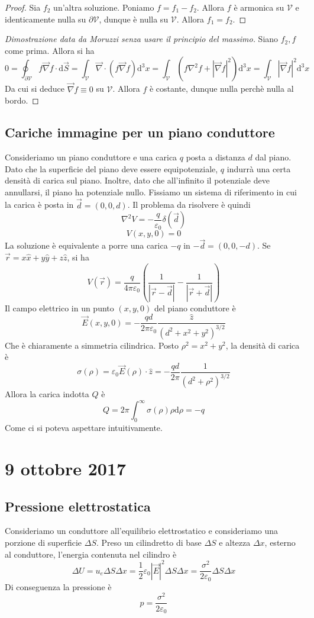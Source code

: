 \documentclass[a4paper,11pt]{book}
\let\oldnabla\nabla
\renewcommand{\nabla}{\vec{\oldnabla}}
\newcommand{\dif}{\mathrm{d}}
\newcommand{\lap}{\oldnabla^2}
\let\oldepsilon\epsilon
\let\oldvarepsilon\varepsilon
\renewcommand{\epsilon}{\oldvarepsilon}
\renewcommand{\varepsilon}{\oldepsilon}
\newcommand{\V}{\mathcal{V}}
\theoremstyle{definition}
\theoremstyle{theorem}
\begin{document}
	\begin{proof}
		Sia $f_2$ un'altra soluzione. Poniamo $f=f_1-f_2$. Allora $f$ è armonica su $\mathcal{V}$ e identicamente nulla su $\partial\mathcal{V}$, dunque è nulla su $\mathcal{V}$. Allora $f_1=f_2$.
	\end{proof}
	\begin{proof}[Dimostrazione data da Moruzzi senza usare il principio del massimo] Siano $f_2,f$ come prima. Allora si ha
		\[0=\oint_{\partial \mathcal{V}}f\nabla f\cdot\dif\vec{S}=\int_{\mathcal{V}}\nabla\cdot\left(f\nabla f\right)\dif^3x=\int_{\V}\left(f\lap f+|\nabla f|^2\right)\dif^3x=\int_{\V}|\nabla f|^2\dif^3x\]
		Da cui si deduce $\nabla f\equiv 0$ su $\V$. Allora $f$ è costante, dunque nulla perchè nulla al bordo.
		
	\end{proof}
\subsection{Cariche immagine per un piano conduttore}
Consideriamo un piano conduttore e una carica $q$ posta a distanza $d$ dal piano. Dato che la superficie del piano deve essere equipotenziale, $q$ indurrà una certa densità di carica sul piano. Inoltre, dato che all'infinito il potenziale deve annullarsi, il piano ha potenziale nullo. Fissiamo un sistema di riferimento in cui la carica è posta in $\vec{d}=(0,0,d)$. Il problema da risolvere è quindi
\[\lap V=-\frac{q}{\epsilon_0}\delta(\vec{d})\]
\[V(x,y,0)=0\]
La soluzione è equivalente a porre una carica $-q$ in $-\vec{d}=(0,0,-d)$. Se $\vec{r}=x\hat{x}+y\hat{y}+z\hat{z}$, si ha
\[V(\vec{r})=\frac{q}{4\pi\epsilon_0}\left(\frac{1}{|\vec{r}-\vec{d}|}-\frac{1}{|\vec{r}+\vec{d}|}\right)\]
Il campo elettrico in un punto $(x,y,0)$ del piano conduttore è
\[\vec{E}(x,y,0)=-\frac{qd}{2\pi\epsilon_0}\frac{\hat{z}}{\left(d^2+x^2+y^2\right)^{3/2}}\]
Che è chiaramente a simmetria cilindrica. Posto $\rho^2=x^2+y^2$, la densità di carica è
\[\sigma(\rho)=\epsilon_0\vec{E}(\rho)\cdot\hat{z}=-\frac{qd}{2\pi}\frac{1}{\left(d^2+\rho^2\right)^{3/2}}\]
Allora la carica indotta $Q$ è
\[Q=2\pi\int_{0}^{\infty}\sigma(\rho)\rho\dif\rho=-q\]
Come ci si poteva aspettare intuitivamente.
\section{9 ottobre 2017}
\subsection{Pressione elettrostatica}
Consideriamo un conduttore all'equilibrio elettrostatico e consideriamo una porzione di superficie $\Delta S$. Preso un cilindretto di base $\Delta S$ e altezza $\Delta x$, esterno al conduttore, l'energia contenuta nel cilindro è
\[\Delta U=u_e\Delta S\Delta x=\frac{1}{2}\epsilon_0|\vec{E}|^2\Delta S\Delta x=\frac{\sigma^2}{2\epsilon_0}\Delta S\Delta x\]
Di conseguenza la pressione è
\[p=\frac{\sigma^2}{2\epsilon_0}\]
\end{document}
